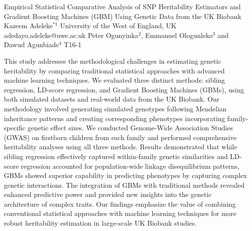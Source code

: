 \begin{talk}
  {Empirical Statistical Comparative Analysis of SNP Heritability Estimators and Gradient Boosting Machines (GBM) Using Genetic Data from the UK Biobank}%
  {Kazeem Adeleke$^{*1}$} %
  {University of the West of England, UK}%
  {adedayo.adeleke@uwe.ac.uk} %
  { Peter Ogunyinka$^{2}$, Emmanuel Ologunleko$^{3}$ and Dawud Agunbiade$^{4}$} %
  {T16-1}%
			
This study addresses the methodological challenges in estimating genetic heritability by comparing traditional statistical approaches with advanced machine learning techniques. We evaluated three distinct methods: sibling regression, LD-score regression, and Gradient Boosting Machines (GBMs), using both simulated datasets and real-world data from the UK Biobank. Our methodology involved generating simulated genotypes following Mendelian inheritance patterns and creating corresponding phenotypes incorporating family-specific genetic effect sizes. We conducted Genome-Wide Association Studies (GWAS) on firstborn children from each family and performed comprehensive heritability analyses using all three methods. Results demonstrated that while sibling regression effectively captured within-family genetic similarities and LD-score regression accounted for population-wide linkage disequilibrium patterns, GBMs showed superior capability in predicting phenotypes by capturing complex genetic interactions. The integration of GBMs with traditional methods revealed enhanced predictive power and provided new insights into the genetic architecture of complex traits. Our findings emphasize the value of combining conventional statistical approaches with machine learning techniques for more robust heritability estimation in large-scale UK Biobank studies.

\medskip


\end{talk}

